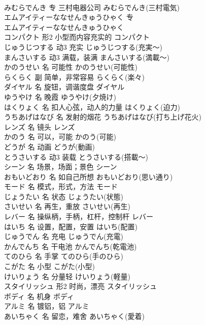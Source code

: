 \documentclass[8pt]{extreport}
\begin{document}
\begin{CJK}{UTF8}{min}
\\	みむらでんき	专	三村电器公司	みむらでんき(三村電気)	
\\	エムアイティーななせんきゅうひゃく	专	
\\	エムアイティーななせんきゅうひゃく
\\	コンパクト	形2	小型而内容充实的	コンパクト	
\\	じゅうじつする	动3	充实	じゅうじつする(充実～)	
\\	まんさいする	动3	满载，装满	まんさいする(満載～)	
\\	かのうせい	名	可能性	かのうせい(可能性)	
\\	らくらく	副	简单，非常容易	らくらく(楽々)	
\\	ダイヤル	名	旋钮，调谐度盘	ダイヤル	
\\	ゆうやけ	名	晚霞	ゆうやけ(夕焼け)	
\\	はくりょく	名	扣人心弦，动人的力量	はくりょく(迫力)	
\\	うちあげはなび	名	发射的烟花	うちあげはなび(打ち上げ花火)	
\\	レンズ	名	镜头	レンズ	
\\	かのう	名	可以，可能	かのう(可能)	
\\	どうが	名	动画	どうが(動画)	
\\	とうさいする	动3	装载	とうさいする(搭載～)	
\\	シーン	名	场景，场面；景色	シーン	
\\	おもいどおり	名	如自己所想	おもいどおり(思い通り)	
\\	モード	名	模式，形式，方法	モード	
\\	じょうたい	名	状态	じょうたい(状態)	
\\	さいせい	名	再生，重放	さいせい(再生)	
\\	レバー	名	操纵柄，手柄，杠杆，控制杆	レバー	
\\	はいち	名	设置，配置，安置	はいち(配置)	
\\	じゅうでん	名	充电	じゅうでん(充電)	
\\	かんでんち	名	干电池	かんでんち(乾電池)	
\\	てのひら	名	手掌	てのひら(手のひら)	
\\	こがた	名	小型	こがた(小型)	
\\	けいりょう	名	分量轻	けいりょう(軽量)	
\\	スタイリッシュ	形2	时尚，漂亮	スタイリッシュ	
\\	ボディ	名	机身	ボディ	
\\	アルミ	名	镀铝，铝	アルミ	
\\	あいちゃく	名	留恋，难舍	あいちゃく(愛着)	

\end{CJK}
\end{document}
